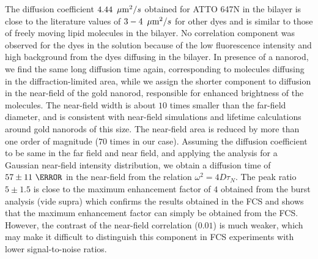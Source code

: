 The diffusion coefficient $4.44~\,\mu\textrm{m}^2/s$ obtained for ATTO 647N in the bilayer is close to the literature values of $3-4~\,\mu\textrm{m}^2/s$\cite{mach2010lipid} for other dyes and is similar to those of freely moving lipid molecules in the bilayer. No correlation component was observed for the dyes in the solution because of the low fluorescence intensity and high background from the dyes diffusing in the bilayer. In presence of a nanorod, we find the same long diffusion time again, corresponding to molecules diffusing in the diffraction-limited area, while we assign the shorter component to diffusion in the near-field of the gold nanorod, responsible for enhanced brightness of the molecules. The near-field width is about $10$ times smaller than the far-field diameter, and is consistent with near-field simulations and lifetime calculations around gold nanorods of this size.\cite{khatua2014resonant,seelig2007nanoparticleinduced} The near-field area is reduced by more than one order of magnitude ($70$ times in our case). Assuming the diffusion coefficient to be same in the far field and near field, and applying the analysis for a Gaussian near-field intensity distribution, we obtain a diffusion time of $57\pm11~\us$ in the near-field from the relation $\omega^2=4D\tau_N$. The peak ratio $5\pm1.5$ is close to the maximum enhancement factor of $4$ obtained from the burst analysis (vide supra) which confirms the results obtained in the FCS and shows that the maximum enhancement factor can simply be obtained from the FCS. However, the contrast of the near-field correlation ($0.01$) is much weaker, which may make it difficult to distinguish this component in FCS experiments with lower signal-to-noise ratios.\\

